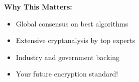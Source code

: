 \documentclass[aspectratio=169,10pt]{beamer}
\newcommand{\teaching}[1]{}
\theoremstyle{plain}
\begin{document}
\begin{frame}
  \vspace{0.5cm}
  
  \begin{redBox}
    \textbf{Why This Matters:}
    \begin{itemize}
      \item Global consensus on best algorithms
      \item Extensive cryptanalysis by top experts
      \item Industry and government backing
      \item Your future encryption standard!
    \end{itemize}
  \end{redBox}
  
  \teaching{Show scope and credibility of the process}
\end{frame}
\end{document}
